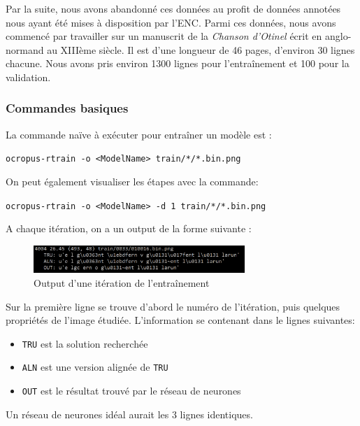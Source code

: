 \documentclass{report}
\begin{document}
Par la suite, nous avons abandonné ces données au profit de données annotées nous ayant été mises à disposition par l'ENC.
Parmi ces données, nous avons commencé par travailler sur un manuscrit de la \textit{Chanson d'Otinel} écrit en anglo-normand au XIIIème siècle.
Il est d'une longueur de 46 pages, d'environ 30 lignes chacune. Nous avons pris environ 1300 lignes pour l'entraînement et 100 pour la validation.

\subsubsection{Commandes basiques}

La commande naïve à exécuter pour entraîner un modèle est :

\begin{center}
    \texttt{ocropus-rtrain -o <ModelName> train/*/*.bin.png}
\end{center}

On peut également visualiser les étapes avec la commande:

\begin{center}
    \texttt{ocropus-rtrain -o <ModelName> -d 1 train/*/*.bin.png}
\end{center}

\noindent A chaque itération, on a un output de la forme suivante : 

\begin{figure}[!h] 
    \center
    \includegraphics[width=8cm]{screen_output.png}
    \caption{Output d'une itération de l'entraînement} %
    \label{API}
\end{figure}

Sur la première ligne se trouve d'abord le numéro de l'itération, puis quelques propriétés de l'image étudiée. L'information se contenant dans le lignes suivantes:
\begin{itemize}
    \item \texttt{TRU} est la solution recherchée
    \item \texttt{ALN} est une version alignée de \texttt{TRU}
    \item \texttt{OUT} est le résultat trouvé par le réseau de neurones
\end{itemize}

Un réseau de neurones idéal aurait les 3 lignes identiques.
\end{document}
